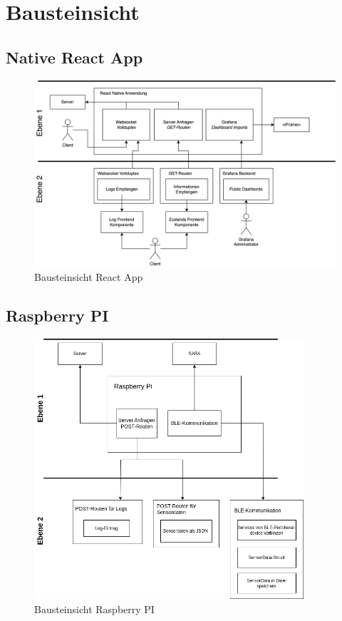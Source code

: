 \documentclass[
]{article}
\begin{document}
\section{Bausteinsicht}

\subsection{Native React App}
\begin{figure}[htbp]
	\centering
	\includegraphics[width=120mm]{resources/BausteinsichtValentin.drawio.png}
	\caption{Bausteinsicht React App}
	\label{fig:ContextDiagram}
\end{figure}  

\subsection{Raspberry PI}
\begin{figure}[htbp]
	\centering
	\includegraphics[width=100mm]{resources/ADABausteinsicht.png}
	\caption{Bausteinsicht Raspberry PI}
	\label{fig:ContextDiagram}
\end{figure}  
\newpage
\end{document}
